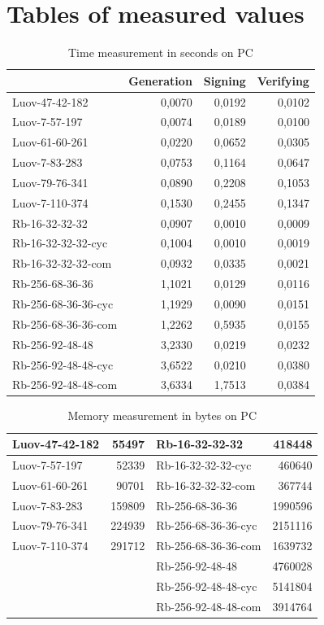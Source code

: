 \documentclass[thesis=M,english]{FITthesis}[2019/12/23]
\begin{document}
\chapter{Tables of measured values}
\begin{table}[]
\centering
\begin{tabular}{|l|r|r|r|}
\hline
& \multicolumn{1}{l|}{{ Generation}} & \multicolumn{1}{l|}{{ Signing}} & \multicolumn{1}{l|}{{ Verifying}} \\ \hline
Luov-47-42-182 & 0,0070 & 0,0192 & 0,0102 \\ \hline
Luov-7-57-197 & 0,0074 & 0,0189 & 0,0100 \\ \hline
Luov-61-60-261 & 0,0220 & 0,0652 & 0,0305 \\ \hline
Luov-7-83-283 & 0,0753 & 0,1164 & 0,0647 \\ \hline
Luov-79-76-341 & 0,0890 & 0,2208 & 0,1053 \\ \hline
Luov-7-110-374 & 0,1530 & 0,2455 & 0,1347 \\ \hline
Rb-16-32-32-32 & 0,0907 & 0,0010 & 0,0009 \\ \hline
Rb-16-32-32-32-cyc & 0,1004 & 0,0010 & 0,0019 \\ \hline
Rb-16-32-32-32-com & 0,0932 & 0,0335 & 0,0021 \\ \hline
Rb-256-68-36-36 & 1,1021 & 0,0129 & 0,0116 \\ \hline
Rb-256-68-36-36-cyc & 1,1929 & 0,0090 & 0,0151 \\ \hline
Rb-256-68-36-36-com & 1,2262 & 0,5935 & 0,0155 \\ \hline
Rb-256-92-48-48 & 3,2330 & 0,0219 & 0,0232 \\ \hline
Rb-256-92-48-48-cyc & 3,6522 & 0,0210 & 0,0380 \\ \hline
Rb-256-92-48-48-com & 3,6334 & 1,7513 & 0,0384 \\ \hline
\end{tabular}
\caption{Time measurement in seconds on PC}
\end{table}

\begin{table}[]
\centering
\begin{tabular}{|l|r|l|r|}
\hline
Luov-47-42-182 & 55497 & Rb-16-32-32-32 & 418448 \\ \hline
Luov-7-57-197 & 52339 & Rb-16-32-32-32-cyc & 460640 \\ \hline
Luov-61-60-261 & 90701 & Rb-16-32-32-32-com & 367744 \\ \hline
Luov-7-83-283 & 159809 & Rb-256-68-36-36 & 1990596 \\ \hline
Luov-79-76-341 & 224939 & Rb-256-68-36-36-cyc & 2151116 \\ \hline
Luov-7-110-374 & 291712 & Rb-256-68-36-36-com & 1639732 \\ \hline
& & Rb-256-92-48-48 & 4760028 \\ \hline
& & Rb-256-92-48-48-cyc & 5141804 \\ \hline
& & Rb-256-92-48-48-com & 3914764 \\ \hline
\end{tabular}
\caption{Memory measurement in bytes on PC}
\end{table}
\end{document}
